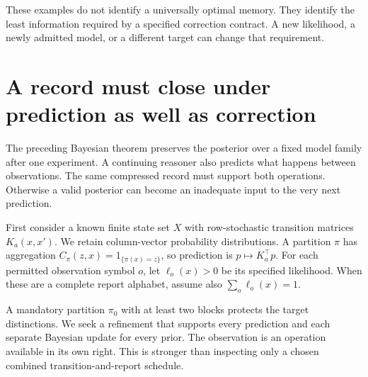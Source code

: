 These examples do not identify a universally optimal memory. They identify the least information required by a specified correction contract. A new likelihood, a newly admitted model, or a different target can change that requirement.


\section{A record must close under prediction as well as correction}
The preceding Bayesian theorem preserves the posterior over a fixed model family after one experiment. A continuing reasoner also predicts what happens between observations. The same compressed record must support both operations. Otherwise a valid posterior can become an inadequate input to the very next prediction.

First consider a known finite state set $X$ with row-stochastic transition matrices $K_a(x,x')$. We retain column-vector probability distributions. A partition $\pi$ has aggregation $C_\pi(z,x)=1_{\{\pi(x)=z\}}$, so prediction is $p\mapsto K_a^\top p$. For each permitted observation symbol $o$, let $\ell_o(x)>0$ be its specified likelihood. When these are a complete report alphabet, assume also $\sum_o\ell_o(x)=1$.

A mandatory partition $\pi_0$ with at least two blocks protects the target distinctions. We seek a refinement that supports every prediction and each separate Bayesian update for every prior. The observation is an operation available in its own right. This is stronger than inspecting only a chosen combined transition-and-report schedule.


